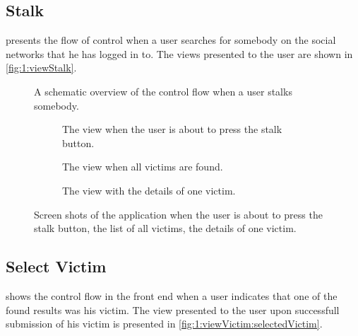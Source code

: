 	\subsection{Stalk}
		 presents the flow of control when a user searches for somebody on the social networks that he has logged in to. The views presented to the user are shown in \autoref{fig:1:viewStalk}.


			\begin{figure}
				\caption{A schematic overview of the control flow when a user stalks somebody.}
				\label{fig:1:controlflowStalk}
			\end{figure}	

			\begin{figure}
				\begin{subfigure}{\textwidth}
					\caption{The view when the user is about to press the stalk button.}
					\label{fig:1:viewStalk:startStalk}
				\end{subfigure}
				\begin{subfigure}{\textwidth}
					\caption{The view when all victims are found.}
					\label{fig:1:viewStalk:allVictims}
				\end{subfigure}		
				\begin{subfigure}{\textwidth}
					\caption{The view with the details of one victim.}
					\label{fig:1:viewStalk:oneVictim}
				\end{subfigure}						
				
				\caption{Screen shots of the application when  the user is about to press the stalk button,  the list of all victims,  the details of one victim.}
				\label{fig:1:viewStalk}
			\end{figure}

	\subsection{Select Victim}
		 shows the control flow in the front end when a user indicates that one of the found results was his victim. The view presented to the user upon successfull submission of his victim is presented in \cref{fig:1:viewVictim:selectedVictim}.

